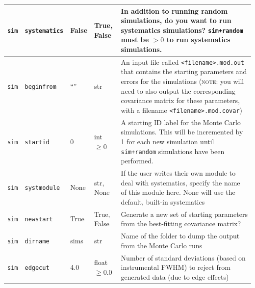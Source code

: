 \begin{center}
\begin{longtable}{p{1.5cm}p{2.5cm}p{2.0cm}p{2.0cm}p{5.0cm}}
\multicolumn{1}{p{1.5cm}}{\texttt{sim}} &
\multicolumn{1}{p{2.5cm}}{\texttt{systematics}} &
\multicolumn{1}{p{2.0cm}}{False} &
\multicolumn{1}{p{2.0cm}}{True, False} &
\multicolumn{1}{p{5.0cm}}{In addition to running random simulations, do you want to run systematics simulations? \texttt{sim+random} must be $> 0$ to run systematics simulations.} \\ \midrule

\multicolumn{1}{p{1.5cm}}{\texttt{sim}} &
\multicolumn{1}{p{2.5cm}}{\texttt{beginfrom}} &
\multicolumn{1}{p{2.0cm}}{``''} &
\multicolumn{1}{p{2.0cm}}{str} &
\multicolumn{1}{p{5.0cm}}{An input file called \texttt{<filename>.mod.out} that contains the starting parameters and errors for the simulations (\textsc{note}: you will need to also output the corresponding covariance matrix for these parameters, with a filename \texttt{<filename>.mod.covar})} \\ \midrule

\multicolumn{1}{p{1.5cm}}{\texttt{sim}} &
\multicolumn{1}{p{2.5cm}}{\texttt{startid}} &
\multicolumn{1}{p{2.0cm}}{0} &
\multicolumn{1}{p{2.0cm}}{int $\ge 0$} &
\multicolumn{1}{p{5.0cm}}{A starting ID label for the Monte Carlo simulations. This will be incremented by 1 for each new simulation until \texttt{sim+random} simulations have been performed.} \\ \midrule

\multicolumn{1}{p{1.5cm}}{\texttt{sim}} &
\multicolumn{1}{p{2.5cm}}{\texttt{systmodule}} &
\multicolumn{1}{p{2.0cm}}{None} &
\multicolumn{1}{p{2.0cm}}{str, None} &
\multicolumn{1}{p{5.0cm}}{If the user writes their own module to deal with systematics, specify the name of this module here. None will use the default, built-in systematics} \\ \midrule

\multicolumn{1}{p{1.5cm}}{\texttt{sim}} &
\multicolumn{1}{p{2.5cm}}{\texttt{newstart}} &
\multicolumn{1}{p{2.0cm}}{True} &
\multicolumn{1}{p{2.0cm}}{True, False} &
\multicolumn{1}{p{5.0cm}}{Generate a new set of starting parameters from the best-fitting covariance matrix?} \\ \midrule

\multicolumn{1}{p{1.5cm}}{\texttt{sim}} &
\multicolumn{1}{p{2.5cm}}{\texttt{dirname}} &
\multicolumn{1}{p{2.0cm}}{sims} &
\multicolumn{1}{p{2.0cm}}{str} &
\multicolumn{1}{p{5.0cm}}{Name of the folder to dump the output from the Monte Carlo runs} \\ \midrule

\multicolumn{1}{p{1.5cm}}{\texttt{sim}} &
\multicolumn{1}{p{2.5cm}}{\texttt{edgecut}} &
\multicolumn{1}{p{2.0cm}}{4.0} &
\multicolumn{1}{p{2.0cm}}{float $\ge0.0$} &
\multicolumn{1}{p{5.0cm}}{Number of standard deviations (based on instrumental FWHM) to reject from generated data (due to edge effects)} \\ \midrule


\end{longtable}
\end{center}
